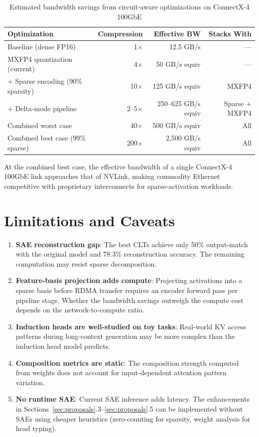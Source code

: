 \documentclass[11pt,letterpaper]{article}
\begin{document}
\begin{table}[htbp]
\centering
\caption{Estimated bandwidth savings from circuit-aware optimizations on ConnectX-4 100GbE}
\label{tab:impact}
\begin{tabular}{@{}lrrr@{}}
\toprule
\textbf{Optimization} & \textbf{Compression} & \textbf{Effective BW} & \textbf{Stacks With} \\
\midrule
Baseline (dense FP16) & 1$\times$ & 12.5 GB/s & --- \\
MXFP4 quantization (current) & 4$\times$ & 50 GB/s equiv & --- \\
+ Sparse encoding (90\% sparsity) & 10$\times$ & 125 GB/s equiv & MXFP4 \\
+ Delta-mode pipeline & 2--5$\times$ & 250--625 GB/s equiv & Sparse + MXFP4 \\
Combined worst case & 40$\times$ & 500 GB/s equiv & All \\
Combined best case (99\% sparse) & 200$\times$ & 2,500 GB/s equiv & All \\
\bottomrule
\end{tabular}
\end{table}

At the combined best case, the effective bandwidth of a single ConnectX-4 100GbE link approaches that of NVLink, making commodity Ethernet competitive with proprietary interconnects for sparse-activation workloads.

\section{Limitations and Caveats}
\label{sec:limitations}

\begin{enumerate}
    \item \textbf{SAE reconstruction gap}: The best CLTs achieve only 50\% output-match with the original model and 78.3\% reconstruction accuracy. The remaining computation may resist sparse decomposition.
    \item \textbf{Feature-basis projection adds compute}: Projecting activations into a sparse basis before RDMA transfer requires an encoder forward pass per pipeline stage. Whether the bandwidth savings outweigh the compute cost depends on the network-to-compute ratio.
    \item \textbf{Induction heads are well-studied on toy tasks}: Real-world KV access patterns during long-context generation may be more complex than the induction head model predicts.
    \item \textbf{Composition metrics are static}: The composition strength computed from weights does not account for input-dependent attention pattern variation.
    \item \textbf{No runtime SAE}: Current SAE inference adds latency. The enhancements in Sections~\ref{sec:proposals}.3--\ref{sec:proposals}.5 can be implemented without SAEs using cheaper heuristics (zero-counting for sparsity, weight analysis for head typing).
\end{enumerate}
\end{document}
